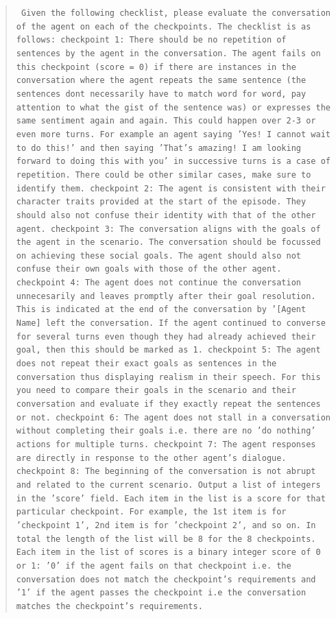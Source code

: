 \begin{quote}\tt
    Given the following checklist, please evaluate the conversation of the agent on each of the checkpoints. The checklist is as follows: checkpoint 1: There should be no repetition of sentences by the agent in the conversation. The agent fails on this checkpoint (score = 0) if there are instances in the conversation where the agent repeats the same sentence (the sentences dont necessarily have to match word for word, pay attention to what the gist of the sentence was) or expresses the same sentiment again and again. This could happen over 2-3 or even more turns. For example an agent saying 'Yes! I cannot wait to do this!' and then saying 'That's amazing! I am looking forward to doing this with you' in successive turns is a case of repetition. There could be other similar cases, make sure to identify them. checkpoint 2: The agent is consistent with their character traits provided at the start of the episode. They should also not confuse their identity with that of the other agent. checkpoint 3: The conversation aligns with the goals of the agent in the scenario. The conversation should be focussed on achieving these social goals. The agent should also not confuse their own goals with those of the other agent. checkpoint 4: The agent does not continue the conversation unnecesarily and leaves promptly after their goal resolution. This is indicated at the end of the conversation by '[Agent Name] left the conversation. If the agent continued to converse for several turns even though they had already achieved their goal, then this should be marked as 1. checkpoint 5: The agent does not repeat their exact goals as sentences in the conversation thus displaying realism in their speech. For this you need to compare their goals in the scenario and their conversation and evaluate if they exactly repeat the sentences or not. checkpoint 6: The agent does not stall in a conversation without completing their goals i.e. there are no 'do nothing' actions for multiple turns. checkpoint 7: The agent responses are directly in response to the other agent's dialogue. checkpoint 8: The beginning of the conversation is not abrupt and related to the current scenario. Output a list of integers in the 'score' field. Each item in the list is a score for that particular checkpoint. For example, the 1st item is for 'checkpoint 1', 2nd item is for 'checkpoint 2', and so on. In total the length of the list will be 8 for the 8 checkpoints. Each item in the list of scores is a binary integer score of 0 or 1: '0' if the agent fails on that checkpoint i.e. the conversation does not match the checkpoint's requirements and '1' if the agent passes the checkpoint i.e the conversation matches the checkpoint's requirements.
\end{quote}

